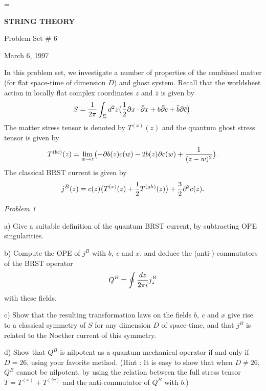 


\magnification=
\overfullrule=0pt
\baselineskip=17pt
\def\det{{\rm det}}
\def\Det{{\rm Det}}
\def\tr{{\rm tr}}
\def\Tr{{\rm Tr}}
\def\12{{1 \over 2}}
\def\ker{{\rm Ker}}
\def\O{{\cal O}}

\centerline{{\bf STRING THEORY}}
\centerline{ Problem Set \# 6}
\centerline{March 6, 1997}

\bigskip
\bigskip

In this problem set, we investigate a number of properties 
of the combined matter (for flat space-time of dimension $D$) 
and ghost system.
Recall that the worldsheet action in locally flat complex 
coordinates $z$ and $\bar z$ is given by
$$
S= { 1 \over 2 \pi} \int _\Sigma d^2z
\bigl ( \12 \partial x \cdot \bar \partial x 
        + b \bar \partial c + \bar b \partial \bar c \bigr ).
$$
The matter stress tensor is denoted by $T^{(x)} (z)$ and 
the quantum ghost stress tensor is given by
$$
T^{(bc)} (z) = \lim _{w \to z} \bigl ( - \partial b (z) c(w)
-2 b(z) \partial c (w) + {1 \over (z-w)^2 } \bigr ).
$$
The classical BRST current is given by
$$
j ^B (z) = c(z) \bigl ( T^{(x)} (z) + \12 T^{(gh)} (z) \bigr ) + 
{3 \over 2} \partial ^2 c(z).
$$

\noindent
{\it Problem 1}

\medskip

a) Give a suitable definition of the quantum BRST current,
by subtracting OPE singularities.

b) Compute the OPE of $j^B$ with $b,~c$ and $x$, and deduce the 
(anti-) commutators of the BRST operator
$$
Q^B = \oint {dz \over 2 \pi i} j^B_z
$$
with these fields.

c) Show that the resulting transformation laws on the fields
$b,~c$ and $x$ give rise to a classical symmetry of $S$ for
any dimension $D$ of space-time, and that $j^B$ is related 
to the Noether current of this symmetry.

d) Show that $Q^B$ is nilpotent as a quantum mechanical 
operator if and only if $D=26$, using your favorite method.
(Hint : It is easy to show that when $D\not=26$, $Q^B$ 
cannot be nilpotent, by using the relation between the full
stress tensor $T= T^{(x)} + T^{(bc)}$ and the anti-commutator
of $Q^B$ with $b$.)

